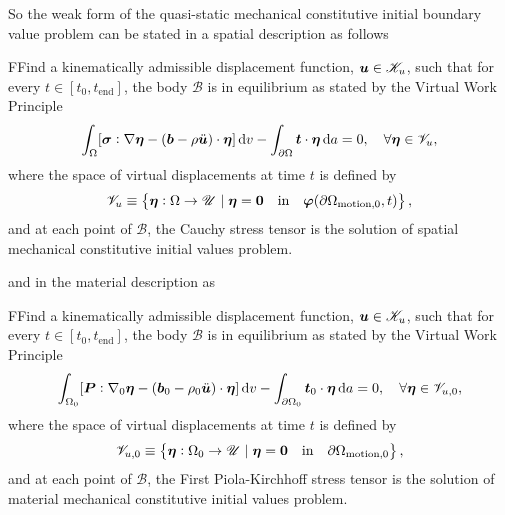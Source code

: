 So the weak form of the quasi-static mechanical constitutive initial boundary value problem can be stated in a spatial description as follows
\begin{problem}
    FFind a kinematically admissible displacement function, $\bm{u}\in \mathscr{K}_u$, such that for every $t\in [t_0,t_\text{end}]$, the body $\mathscr{B}$ is in equilibrium as stated by the Virtual Work Principle
        \begin{equation}
        \int_\Omega [\bm{\sigma}:\nabla \bm{\eta} - (\bm{b}-\rho\ddot{\bm u})\cdot \bm{\eta}]\,\mathrm{d} v - \int_{\partial\Omega} \bm{t}\cdot \bm{\eta}\,\mathrm{d} a = 0,\quad \forall \bm{\eta} \in \mathscr{V}_u,
    \end{equation}
    where the space of virtual displacements at time $t$ is defined by
    \begin{equation}
        \mathscr{V}_u \equiv \left\{\bm{\eta}:\Omega\to \mathscr{U}\;|\;\bm{\eta} = \bm{0}\quad \text{in}\quad \bm \varphi(\partial\Omega_\text{motion,0},t)\right\},
    \end{equation}
    and at each point of $\mathscr{B}$, the Cauchy stress tensor is the solution of spatial mechanical constitutive initial values problem.
\end{problem}
and in the material description as
\begin{problem}
    FFind a kinematically admissible displacement function, $\bm{u}\in \mathscr{K}_u$, such that for every $t\in [t_0,t_\text{end}]$, the body $\mathscr{B}$ is in equilibrium as stated by the Virtual Work Principle
        \begin{equation}
        \int_{\Omega_0} [\bm{P}:\nabla_0 \bm{\eta} - (\bm{b}_0-\rho_0\ddot{\bm u})\cdot \bm{\eta}]\,\mathrm{d} v - \int_{\partial\Omega_0} \bm{t}_0\cdot \bm{\eta}\,\mathrm{d} a = 0,\quad \forall \bm{\eta} \in \mathscr{V}_{u,0},
    \end{equation}
    where the space of virtual displacements at time $t$ is defined by
    \begin{equation}
        \mathscr{V}_{u,0} \equiv \left\{\bm{\eta}:\Omega_0\to \mathscr{U}\;|\;\bm{\eta} = \bm{0}\quad \text{in}\quad \partial\Omega_\text{motion,0}\right\},
    \end{equation}
    and at each point of $\mathscr{B}$, the First Piola-Kirchhoff stress tensor is the solution of material mechanical constitutive initial values problem.
\end{problem}

